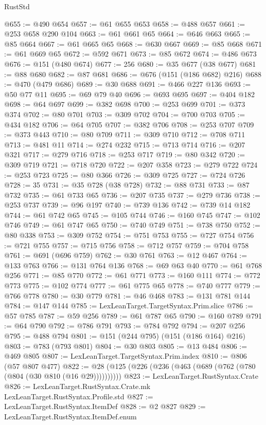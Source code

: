 \begin{lexlean}{RustStd}
\begin{coremodule}
@655 := @490 @654
@657 := @61 @655 @653
@658 := @488 @657
@661 := @253 @658 @290 @104
@663 := @61 @661 @65
@664 := @646 @663
@665 := @85 @664
@667 := @61 @665 @65
@668 := @630 @667
@669 := @85 @668
@671 := @61 @669 @65
@672 := @592 @671
@673 := @85 @672
@674 := @486 @673
@676 := @151 (@480 @674)
@677 := 256
@680 := @35 @677 (@38 @677)
@681 := @88 @680
@682 := @87 @681
@686 := @676 (@151 (@186 @682) @216)
@688 := @470 (@479 @686)
@689 := @30 @688
@691 := @466 @227 @136
@693 := @50 @77 @11
@695 := @69 @79 @40
@696 := @693 @695
@697 := @404 @182
@698 := @64 @697
@699 := @382 @698
@700 := @253 @699
@701 := @373 @374
@702 := @80 @701
@703 := @309 @702
@704 := @700 @703
@705 := @434 @182
@706 := @64 @705
@707 := @382 @706
@708 := @253 @707
@709 := @373 @443
@710 := @80 @709
@711 := @309 @710
@712 := @708 @711
@713 := @481 @11
@714 := @274 @232
@715 := @713 @714
@716 := @207 @321
@717 := @279 @716
@718 := @253 @717
@719 := @80 @342
@720 := @309 @719
@721 := @718 @720
@722 := @207 @358
@723 := @279 @722
@724 := @253 @723
@725 := @80 @366
@726 := @309 @725
@727 := @724 @726
@728 := 35
@731 := @35 @728 (@38 @728)
@732 := @88 @731
@733 := @87 @732
@735 := @61 @733 @65
@736 := @207 @735
@737 := @279 @736
@738 := @253 @737
@739 := @96 @197
@740 := @739 @136
@742 := @739 @14 @182
@744 := @61 @742 @65
@745 := @105 @744
@746 := @160 @745
@747 := @102 @746
@749 := @61 @747 @65
@750 := @740 @749
@751 := @738 @750
@752 := @80 @338
@753 := @309 @752
@754 := @751 @753
@755 := @727 @754
@756 := @721 @755
@757 := @715 @756
@758 := @712 @757
@759 := @704 @758
@761 := @691 (@696 @759)
@762 := @30 @761
@763 := @12 @467
@764 := @133 @763
@766 := @131 @764 @136
@768 := @69 @63 @40
@770 := @61 @768 @256
@771 := @85 @770
@772 := @61 @771
@773 := @160 @111
@774 := @772 @773
@775 := @102 @774
@777 := @61 @775 @65
@778 := @740 @777
@779 := @766 @778
@780 := @30 @779
@781 := @46 @468
@783 := @131 @781 @144
@784 := @147 @144
@785 := LexLeanTarget.TargetSyntax.Prim.slice
@786 := @57 @785
@787 := @59 @256
@789 := @61 @787 @65
@790 := @160 @789
@791 := @64 @790
@792 := @786 @791
@793 := @784 @792
@794 := @207 @256
@795 := @488 @794
@801 := @151 (@244 @795) (@151 (@186 @164) @216)
@803 := @783 (@793 @801)
@804 := @30 @803
@805 := @13 @484
@806 := @469 @805
@807 := LexLeanTarget.TargetSyntax.Prim.index
@810 := @806 (@57 @807 @477)
@822 := @28 (@125 (@226 (@236 (@463 (@689 (@762 (@780 (@804 (@30 @810 (@16 @29))))))))))
@823 := LexLeanTarget.RustSyntax.Crate
@826 := LexLeanTarget.RustSyntax.Crate.mk LexLeanTarget.RustSyntax.Profile.std
@827 := LexLeanTarget.RustSyntax.ItemDef
@828 := @2 @827
@829 := LexLeanTarget.RustSyntax.ItemDef.enum

\end{coremodule}
\end{lexlean}
